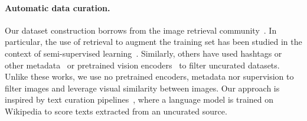 \paragraph{Automatic data curation.}
Our dataset construction borrows from the image retrieval community~\citep{weinzaepfel2021learning,radenovic2018fine,berman2019multigrain,douze2009evaluation,tolias2015particular,revaud2019learning}.
In particular, the use of retrieval to augment the training set has been studied in the context of semi-supervised learning~\citep{yalniz2019billion}.
Similarly, others have used hashtags or other metadata~\citep{mahajan2018exploring,radford2021learning} or pretrained vision encoders~\citep{schuhmann2021laion, schuhmann2022laion} to filter uncurated datasets.
Unlike these works, we use no pretrained encoders, metadata nor supervision to filter images and leverage visual similarity between images.
Our approach is inspired by text curation pipelines~\citep{wenzek2019ccnet}, where a language model is trained on Wikipedia to score texts extracted from an uncurated source.
 

